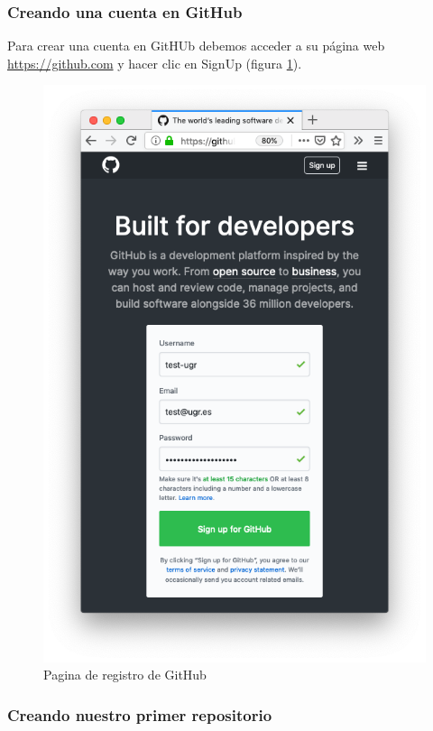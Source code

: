 \subsubsection{Creando una cuenta en GitHub}

Para crear una cuenta en GitHUb debemos acceder a su página web \url{https://github.com} y hacer clic en SignUp (figura \ref{fig:git1}).

\begin{figure}[h!]
\centering
\includegraphics[width=1.0\textwidth]{../images/git1}
\caption{Pagina de registro de GitHub}
\label{fig:git1}
\end{figure}

\subsubsection{Creando nuestro primer repositorio}

